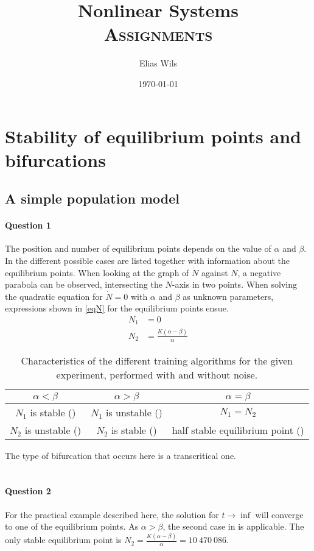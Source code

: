 \documentclass[a4paper,11pt]{article}
\title{Nonlinear Systems \\[1ex]
    \Large \textsc{Assignments}}
\author{Elias Wils}
\date{\today}
\begin{document}
\maketitle
\newpage
\tableofcontents

\newpage
\section{Stability of equilibrium points and \\bifurcations}    
\subsection{A simple population model}
\paragraph{Question 1}\: The position and number of equilibrium points depends on the value of $\alpha$ and $\beta$.
In  the different possible cases are listed together with information about the equilibrium points.
When looking at the graph of $\dot{N}$ against $N$, a negative parabola can be observed, intersecting the $N$-axis in two points.
When solving the quadratic equation for $\dot{N}=0$ with $\alpha$ and $\beta$ as unknown parameters, expressions shown in \eqref{eqN} for
the equilibrium points ensue.
\begin{align}
	N_1 &= 0\\
	N_2 &= \frac{K(\alpha-\beta)}{\alpha}
	\label{eqN}
\end{align}
\begin{table}[H]
	\centering
	\begin{tabular}{|c|c|c|}
	\hline
	$\alpha<\beta$ & $\alpha>\beta$ & $\alpha=\beta$\\
	\hline
	$N_1$ is stable (\CIRCLE) & $N_1$ is unstable (\Circle) & $N_1=N_2$\\
	$N_2$ is unstable (\Circle) & $N_2$ is stable (\CIRCLE) & half stable equilibrium point (\RIGHTcircle)\\
	\hline
	\end{tabular}
	\caption{Characteristics of the different training algorithms for the given experiment, performed with and without noise. }
	\label{tbeq1}
\end{table}
The type of bifurcation that occurs here is a transcritical one.\\\\
\paragraph{Question 2}\: For the practical example described here, the solution for $t\rightarrow\inf$ will converge to one 
of the equilibrium points. As $\alpha>\beta$, the second case in  is applicable. The only stable equilibrium point
is $N_2=\frac{K(\alpha-\beta)}{\alpha}=10\:470\:086$.
\end{document}
